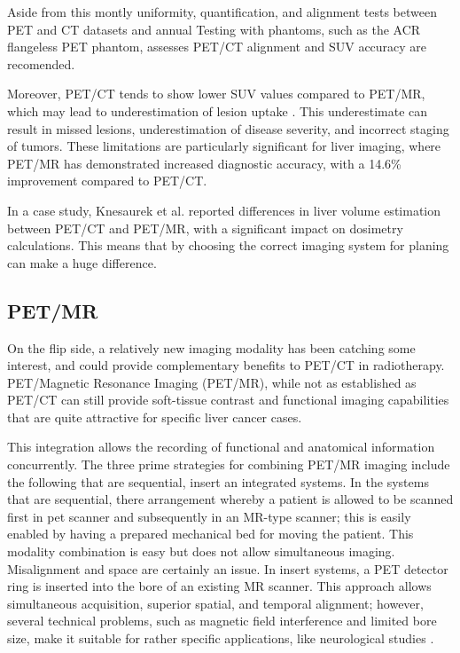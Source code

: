\begin{multicols}{2}
Aside from this montly uniformity, quantification, and alignment tests between PET and CT datasets and annual Testing with phantoms, such as the ACR flangeless PET phantom, assesses PET/CT alignment and SUV accuracy are recomended.

Moreover, PET/CT tends to show lower SUV values compared to PET/MR, which may lead to underestimation of lesion uptake \cite{Prado-Wohlwend2023}. This underestimate can result in missed lesions, underestimation of disease severity, and incorrect staging of tumors. These limitations are particularly significant for liver imaging, where PET/MR has demonstrated increased diagnostic accuracy, with a 14.6\% improvement compared to PET/CT\cite{Prado-Wohlwend2023}.

In a case study, Knesaurek et al. \cite{knesaurek2018} reported differences in liver volume estimation between PET/CT and PET/MR, with a significant impact on dosimetry calculations. %
 This means that by choosing the correct imaging system for planing can make a huge difference. 


\subsection{PET/MR}
On the flip side, a relatively new imaging modality has been catching some interest, and could provide complementary benefits to PET/CT in radiotherapy. PET/Magnetic Resonance Imaging (PET/MR), while not as established as PET/CT can still provide soft-tissue contrast and functional imaging capabilities that are quite attractive for specific liver cancer cases.

This integration allows the recording of functional and anatomical information concurrently. The three prime strategies for combining PET/MR imaging include the following that are sequential, insert an integrated systems. In the systems that are sequential, there arrangement whereby a patient is allowed to be scanned first in pet scanner and subsequently in an MR-type scanner; this is easily enabled by having a prepared mechanical bed for moving the patient. This modality combination is easy but does not allow  simultaneous imaging. Misalignment and space are certainly an issue. In insert systems, a PET detector ring is inserted into the bore of an existing MR scanner. This approach allows simultaneous acquisition, superior spatial, and temporal alignment; however, several technical problems, such as magnetic field interference and limited bore size, make it suitable for rather specific applications, like neurological studies \cite{ziegler2013}.



\end{multicols}
